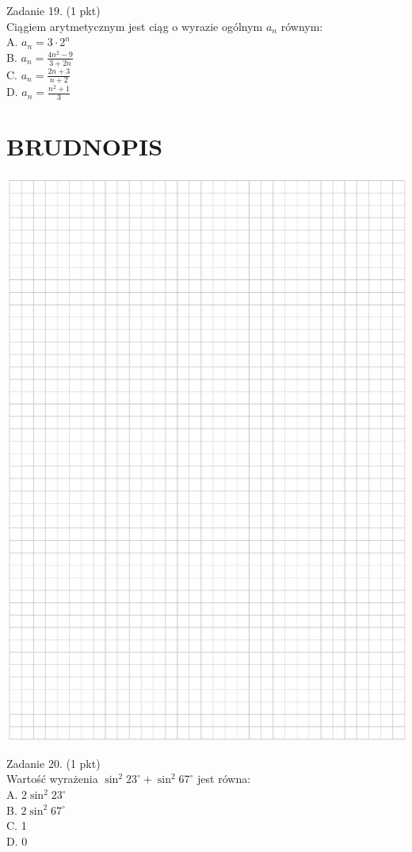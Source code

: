 \documentclass[10pt]{article}
\begin{document}
Zadanie 19. (1 pkt)\\
Ciągiem arytmetycznym jest ciąg o wyrazie ogólnym \(a_{n}\) równym:\\
A. \(a_{n}=3 \cdot 2^{n}\)\\
B. \(a_{n}=\frac{4 n^{2}-9}{3+2 n}\)\\
C. \(a_{n}=\frac{2 n+3}{n+2}\)\\
D. \(a_{n}=\frac{n^{2}+1}{3}\)

\section*{BRUDNOPIS}
\begin{center}
\includegraphics[max width=\textwidth]{2024_11_21_9a9f600c3b3af5013d80g-07}
\end{center}

Zadanie 20. (1 pkt)\\
Wartość wyrażenia \(\sin ^{2} 23^{\circ}+\sin ^{2} 67^{\circ}\) jest równa:\\
A. \(2 \sin ^{2} 23^{\circ}\)\\
B. \(2 \sin ^{2} 67^{\circ}\)\\
C. 1\\
D. 0
\end{document}
